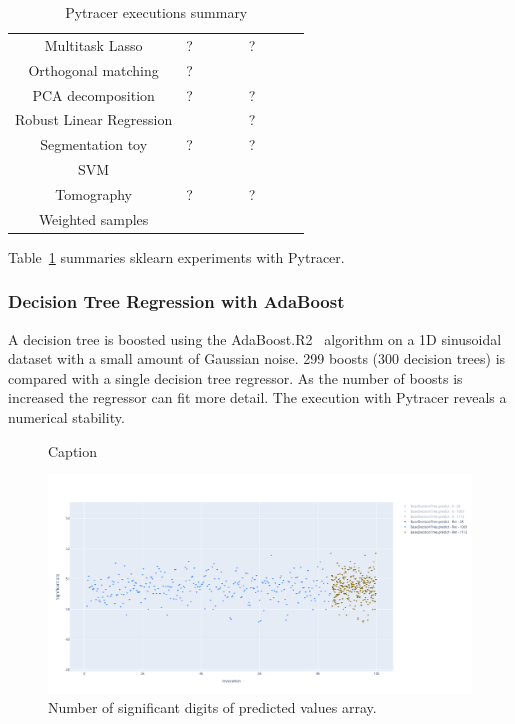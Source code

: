 \documentclass[11pt]{article}
\newcommand{\cross}[0]{\cellcolor{red!65}\ding{53}}
\newcommand{\valid}[0]{\cellcolor{green!75!black}\ding{51}}
\newcommand{\warn}[0]{\cellcolor{orange!75}?}
\begin{document}
\begin{table}[]
\begin{tabular}{|c|c|c|c|c||c|c|c|c|}
    Multitask Lasso & \warn & \valid & \valid & \valid & \warn & \cross & \valid & \valid \\
    Orthogonal matching & \warn & \valid & \valid & \valid & \cross & \valid & \cross & \valid \\
    PCA decomposition & \warn & \valid & \valid & \valid & \warn & \cross & \valid & \cross \\
    Robust Linear Regression & \valid & \valid & \valid & \valid & \warn & \cross & \valid & \cross \\
    Segmentation toy & \warn & \valid & \valid & \cross & \warn & \cross & \cross & \cross \\
    SVM & \valid & \valid & \valid & \valid & \valid & \cross & \valid & \cross \\
    Tomography & \warn & \valid & \valid & \cross & \warn & \cross & \cross & \cross \\
    Weighted samples & \valid & \valid & \valid & \valid & \valid & \cross & \valid & \cross \\
    \hline
    \end{tabular}
    \caption{Pytracer executions summary}
    \label{tab:pytracer_sklearn_results_summary}
\end{table}

Table~\ref{tab:pytracer_sklearn_results_summary} summaries sklearn experiments with Pytracer.


\subsubsection{Decision Tree Regression with AdaBoost}

A decision tree is boosted using the AdaBoost.R2~\cite{drucker1997improving} 
algorithm on a 1D sinusoidal dataset with a small amount of Gaussian noise. 
299 boosts (300 decision trees) is compared with a single decision tree regressor. 
As the number of boosts is increased the regressor can fit more detail. 
The execution with Pytracer reveals a numerical stability.

\begin{figure}
    \centering
    \caption{Caption}
    \includegraphics[width=\linewidth]{figure/adaboost/predict_adaboost_s.png}
    \caption{Number of significant digits of predicted values array.}
    \label{fig:adaboost_predict_s}
\end{figure}
\end{document}
